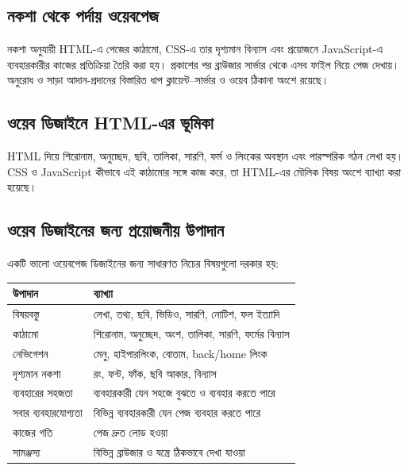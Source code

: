 

\subsection{নকশা থেকে পর্দায় ওয়েবপেজ}
নকশা অনুযায়ী HTML-এ পেজের কাঠামো, CSS-এ তার দৃশ্যমান বিন্যাস এবং প্রয়োজনে JavaScript-এ ব্যবহারকারীর কাজের প্রতিক্রিয়া তৈরি করা হয়। প্রকাশের পর ব্রাউজার সার্ভার থেকে এসব ফাইল নিয়ে পেজ দেখায়। অনুরোধ ও সাড়া আদান-প্রদানের বিস্তারিত ধাপ ক্লায়েন্ট–সার্ভার ও ওয়েব ঠিকানা অংশে রয়েছে।

\subsection{ওয়েব ডিজাইনে HTML-এর ভূমিকা}
HTML দিয়ে শিরোনাম, অনুচ্ছেদ, ছবি, তালিকা, সারণি, ফর্ম ও লিংকের অবস্থান এবং পারস্পরিক গঠন লেখা হয়। CSS ও JavaScript কীভাবে এই কাঠামোর সঙ্গে কাজ করে, তা HTML-এর মৌলিক বিষয় অংশে ব্যাখ্যা করা হয়েছে।

\subsection{ওয়েব ডিজাইনের জন্য প্রয়োজনীয় উপাদান}

একটি ভালো ওয়েবপেজ ডিজাইনের জন্য সাধারণত নিচের বিষয়গুলো দরকার হয়:

\begin{center}
\begin{tabular}{|p{}|p{}|}
\hline
\textbf{উপাদান} & \textbf{ব্যাখ্যা} \\
\hline
বিষয়বস্তু & লেখা, তথ্য, ছবি, ভিডিও, সারণি, নোটিশ, ফল ইত্যাদি \\
\hline
কাঠামো & শিরোনাম, অনুচ্ছেদ, অংশ, তালিকা, সারণি, ফর্মের বিন্যাস \\
\hline
নেভিগেশন & মেনু, হাইপারলিংক, বোতাম, back/home লিংক \\
\hline
দৃশ্যমান নকশা & রং, ফন্ট, ফাঁক, ছবি আকার, বিন্যাস \\
\hline
ব্যবহারের সহজতা & ব্যবহারকারী যেন সহজে বুঝতে ও ব্যবহার করতে পারে \\
\hline
সবার ব্যবহারযোগ্যতা & বিভিন্ন ব্যবহারকারী যেন পেজ ব্যবহার করতে পারে \\
\hline
কাজের গতি & পেজ দ্রুত লোড হওয়া \\
\hline
সামঞ্জস্য & বিভিন্ন ব্রাউজার ও যন্ত্রে ঠিকভাবে দেখা যাওয়া \\
\hline
\end{tabular}
\end{center}

